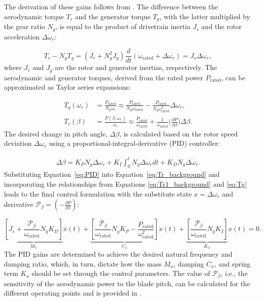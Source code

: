 The derivation of these gains follows from \cite{jonkman2009definition}. The difference between the aerodynamic torque $T_r$ and the generator torque $T_g$, with the latter multiplied by the gear ratio $N_g$, is equal to the product of drivetrain inertia $J_{s}$ and the rotor acceleration $\Delta \dot{\omega}_r$:

\begin{equation} \label{eq:Tr1_background}
    T_r -N_g T_g = (J_r + N_g^2 J_g) \frac{d}{dt}(\omega_{\text{rated}} + \Delta \omega_r) = J_{s} \Delta \dot{\omega}_r,
\end{equation}
where $J_r$ and $J_g$ are the rotor and generator inertias, respectively. The aerodynamic and generator torques, derived from the rated power $P_{\text{rated}}$, can be approximated as Taylor series expansions:

\begin{align}
    T_g(\omega_r) &= \frac{P_{\text{rated}}}{N_g \omega_r} \approx  \frac{P_{\text{rated}}}{N_g \omega_{\text{rated}}} - \frac{P_{\text{rated}}}{N_g\omega_{\text{rated}}^2} \Delta \omega_r,  \label{eq:Tg}\\
    T_r(\beta) &= \frac{P(\beta,\omega_r)}{\omega_r}   \approx \frac{P_{\text{rated}}}{\omega_{\text{rated}}} + \frac{1}{\omega_{\text{rated}}}\Big(\frac{\partial P}{\partial \beta}\Big) \Delta \beta.  \label{eq:Tr_background}
\end{align}
%
The desired change in pitch angle, $\Delta \beta$, is calculated based on the rotor speed deviation $\Delta \omega_r$ using a proportional-integral-derivative (PID) controller:

\begin{align} \label{eq:PID}
    \Delta \beta = K_P N_g \Delta \omega_r + K_I \int_{0}^{t}N_g \Delta \omega_r dt + K_D N_g \Delta \dot{\omega}_r.
\end{align}
%
Substituting Equation~\eqref{eq:PID} into Equation~\eqref{eq:Tr_background} and incorporating the relationships from Equations \eqref{eq:Tr1_background} and \eqref{eq:Tg} leads to the final control formulation with the substitute state $\dot{x} = \Delta \omega_r$ and derivative $\mathcal{P}_\beta = \left( -\frac{\partial P}{\partial \beta} \right)$:

\begin{equation}\label{eq:PID2} 
    \underbrace{\left[ J_{s} + \frac{\mathcal{P}_\beta}{\omega_{\text{rated}}} N_{g} K_D \right]}_{M_{x}} \ddot{x}(t) 
    + \underbrace{\left[ \frac{\mathcal{P}_\beta}{\omega_{\text{rated}}} N_{g} K_P - \frac{P_{\text{rated}}}{\omega_{\text{rated}}^2} \right]}_{C_{x}} \dot{x} (t)
    + \underbrace{\left[ \frac{\mathcal{P}_\beta}{\omega_{\text{rated}}} N_{g} K_I \right]}_{K_{x}} x(t) = 0.
\end{equation}
%
The PID gains are determined to achieve the desired natural frequency and damping ratio, which, in turn, dictate how the mass $M_{x}$, damping $C_{x}$, and spring term $K_{x}$ should be set through the control parameters. The value of  $\mathcal{P}_\beta$, i.e., the sensitivity of the aerodynamic power to the blade pitch, can be calculated for the different operating points and is provided in \cite{jonkman2009definition}. 

